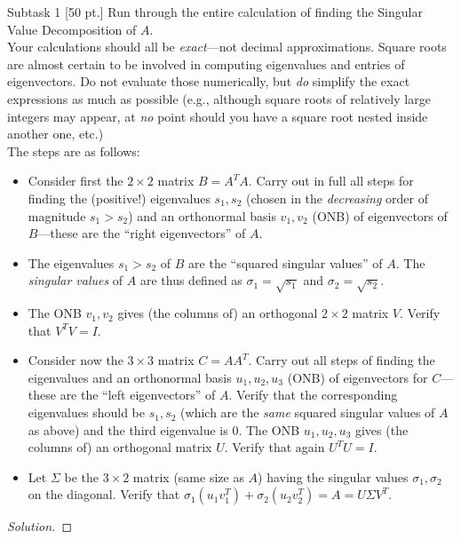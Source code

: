 \documentclass[12pt]{article}
\begin{document}
\begin{problem}{Subtask 1 [50 pt.]}
Run through the entire calculation of finding the Singular Value Decomposition of $A$. \\

Your calculations should all be \textit{exact}—not decimal approximations. Square roots are almost certain to be involved in computing eigenvalues and entries of eigenvectors. Do not evaluate those numerically, but \textit{do} simplify the exact expressions as much as possible (e.g., although square roots of relatively large integers may appear, at \textit{no} point should you have a square root nested inside another one, etc.) \\

The steps are as follows:
\begin{itemize}
    \item Consider first the $2 \times 2$ matrix $B = A^T A$. Carry out in full all steps for finding the (positive!) eigenvalues $s_1, s_2$ (chosen in the \textit{decreasing} order of magnitude $s_1 > s_2$) and an orthonormal basis $v_1, v_2$ (ONB) of eigenvectors of $B$—these are the ``right eigenvectors'' of $A$.
    \item The eigenvalues $s_1 > s_2$ of $B$ are the ``squared singular values'' of $A$. The \textit{singular values} of $A$ are thus defined as $\sigma_1 = \sqrt{s_1}$ and $\sigma_2 = \sqrt{s_2}$.
    \item The ONB $v_1, v_2$ gives (the columns of) an orthogonal $2 \times 2$ matrix $V$. Verify that $V^T V = I$.
    \item Consider now the $3 \times 3$ matrix $C = AA^T$. Carry out all steps of finding the eigenvalues and an orthonormal basis $u_1, u_2, u_3$ (ONB) of eigenvectors for $C$—these are the ``left eigenvectors'' of $A$. Verify that the corresponding eigenvalues should be $s_1, s_2$ (which are the \textit{same} squared singular values of $A$ as above) and the third eigenvalue is $0$. The ONB $u_1, u_2, u_3$ gives (the columns of) an orthogonal matrix $U$. Verify that again $U^T U = I$.
    \item Let $\Sigma$ be the $3 \times 2$ matrix (same size as $A$) having the singular values $\sigma_1, \sigma_2$ on the diagonal. Verify that $\sigma_1(u_1 v_1^T) + \sigma_2(u_2 v_2^T) = A = U \Sigma V^T$.
\end{itemize}
\end{problem}

\begin{proof}[Solution]
\end{proof}
\end{document}
